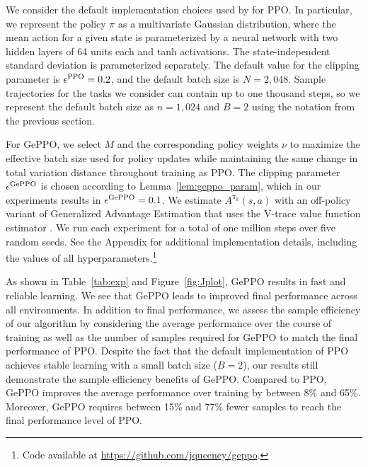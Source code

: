\documentclass{article}
\begin{document}
We consider the default implementation choices used by \citet{henderson_2018} for PPO. In particular, we represent the policy $\pi$ as a multivariate Gaussian distribution, where the mean action for a given state is parameterized by a neural network with two hidden layers of 64 units each and tanh activations. The state-independent standard deviation is parameterized separately. The default value for the clipping parameter is $\epsilon^{\textnormal{PPO}}=0.2$, and the default batch size is $N=2{,}048$. Sample trajectories for the tasks we consider can contain up to one thousand steps, so we represent the default batch size as $n=1{,}024$ and $B=2$ using the notation from the previous section. 

For GePPO, we select $M$ and the corresponding policy weights $\nu$ to maximize the effective batch size used for policy updates while maintaining the same change in total variation distance throughout training as PPO. The clipping parameter $\epsilon^{\textnormal{GePPO}}$ is chosen according to Lemma~\ref{lem:geppo_param}, which in our experiments results in $\epsilon^{\textnormal{GePPO}}=0.1$. We estimate $A^{\pi_k}(s,a)$ with an off-policy variant of Generalized Advantage Estimation \citep{schulman_2016} that uses the V-trace value function estimator \citep{espeholt_2018}. We run each experiment for a total of one million steps over five random seeds. See the Appendix for additional implementation details, including the values of all hyperparameters.\footnote{Code available at \url{https://github.com/jqueeney/geppo}.} 

As shown in Table~\ref{tab:exp} and Figure~\ref{fig:Jplot}, GePPO results in fast and reliable learning. We see that GePPO leads to improved final performance across all environments. In addition to final performance, we assess the sample efficiency of our algorithm by considering the average performance over the course of training as well as the number of samples required for GePPO to match the final performance of PPO. Despite the fact that the default implementation of PPO achieves stable learning with a small batch size ($B=2$), our results still demonstrate the sample efficiency benefits of GePPO. Compared to PPO, GePPO improves the average performance over training by between 8\% and 65\%. Moreover, GePPO requires between 15\% and 77\% fewer samples to reach the final performance level of PPO.
\end{document}
